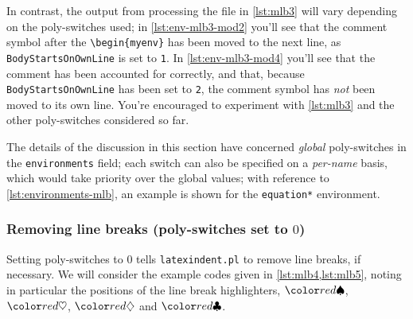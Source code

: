 \begin{minipage}{.45\linewidth}
\end{minipage}
\hfill
\begin{minipage}{.45\linewidth}
\end{minipage}

In contrast, the output from processing the file in \cref{lst:mlb3} will vary depending 
on the poly-switches used; in \cref{lst:env-mlb3-mod2} you'll see that the comment symbol after 
the \lstinline!\begin{myenv}! has been moved to the next line, as \texttt{BodyStartsOnOwnLine} 
  is set to \texttt{1}. In \cref{lst:env-mlb3-mod4} you'll see that the comment has been accounted 
  for correctly, and that, because \texttt{BodyStartsOnOwnLine} has been set to \texttt{2}, 
  the comment symbol has \emph{not} been moved to its own line. You're encouraged to experiment 
  with \cref{lst:mlb3} and the other poly-switches considered so far.

\begin{minipage}{.45\linewidth}
\end{minipage}
\hfill
\begin{minipage}{.45\linewidth}
\end{minipage}

The details of the discussion in this section have concerned \emph{global} poly-switches in the \texttt{environments} field;
each switch can also be specified on a \emph{per-name} basis, which would take priority over the global values; with 
reference to \vref{lst:environments-mlb}, an example is shown for the \texttt{equation*} environment.

\subsubsection{Removing line breaks (poly-switches set to $0$)}
Setting poly-switches to $0$ tells \texttt{latexindent.pl} to remove line breaks, if necessary. We will consider the
example codes given in \cref{lst:mlb4,lst:mlb5}, noting in particular the positions of 
the line break highlighters, $\BeginStartsOnOwnLine$, $\BodyStartsOnOwnLine$, $\EndStartsOnOwnLine$
and $\EndFinishesWithLineBreak$.

